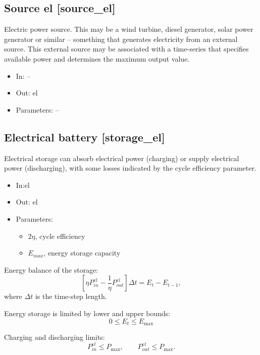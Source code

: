 \documentclass[12pt]{article}
\begin{document}
\subsection{Source el [source\_el]}

Electric power source. This may be a wind turbine, diesel generator, solar power generator or similar – something that generates electricity from an external source. 
This external source may be associated with a time-series that specifies available power and determines the maximum output value.

\begin{itemize}
\item In: --
\item Out: el
\item Parameters: --
\end{itemize}


\subsection{Electrical battery [storage\_el]}
Electrical storage can absorb electrical power (charging) or supply electrical power (discharging), with some losses indicated by the cycle efficiency parameter.

\begin{itemize}
\item In:el
\item Out: el
\item Parameters:
\begin{itemize}[noitemsep,topsep=0pt]
	\item $2\eta$,  cycle efficiency
	\item $E_{max}$,  energy storage capacity
\end{itemize}
\end{itemize}

\medskip\noindent
Energy balance of the storage:
\begin{equation}
	 \left[  \eta P_{in}^{el}-\frac{1}{ \eta }P_{out}^{el} \right]  \Delta t=E_{t}-E_{t-1}, 
\end{equation}
where  $\Delta t$  is the time-step length.


Energy storage is limited by lower and upper bounds:
 \begin{equation}
 0 \leq E_{t} \leq E_{\max } 
 \end{equation}
 
Charging and discharging limits:
 \begin{equation}
 P_{in}^{el} \leq P_{\max } , \qquad
 P_{out}^{el} \leq P_{\max } .
 \end{equation}
\end{document}
